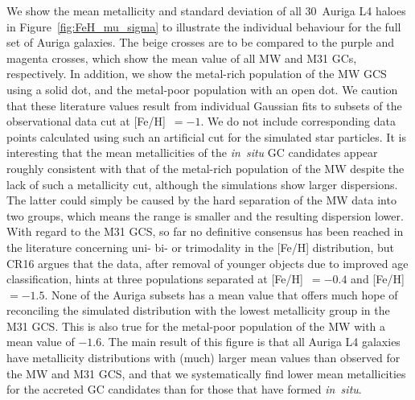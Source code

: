 \documentclass[a4paper,fleqn,usenatbib]{mnras}
\begin{document}
We show the mean metallicity and standard deviation of all $30$~Auriga L4 haloes
in Figure~\ref{fig:FeH_mu_sigma} to illustrate the individual behaviour for the 
full set of Auriga galaxies. The beige crosses are to be compared to the purple 
and magenta crosses, which show the mean value of all MW and M31 GCs, respectively. 
In addition, we show the metal-rich population of the MW GCS using a solid dot, 
and the metal-poor population with an open dot. We caution that
these literature values result from individual Gaussian fits to subsets of the 
observational data cut at [Fe/H]~$= -1$. We do not include corresponding data 
points calculated using such an artificial cut for the simulated star particles.
It is interesting that the mean metallicities of the {\it in~situ} GC candidates 
appear roughly consistent with that of the metal-rich population of the MW despite 
the lack of such a metallicity cut, although the simulations show larger dispersions. 
The latter could simply be caused by the hard separation of the MW data into two 
groups, which means the range is smaller and the resulting dispersion lower. With 
regard to the M31 GCS, so far no definitive consensus has been reached
in the literature concerning uni- bi- or trimodality in the [Fe/H] distribution, 
but CR16 argues that the data, after removal of younger objects due to improved 
age classification, hints at three populations separated at [Fe/H]~$=-0.4$ and 
[Fe/H]~$ = -1.5$. None of the Auriga subsets has a mean value that offers much 
hope of reconciling the simulated distribution with the lowest metallicity 
group in the M31 GCS. This is also true for the metal-poor population of the 
MW with a mean value of $-1.6$. The main result of this figure is 
that all Auriga L4 galaxies have metallicity distributions with (much) larger
mean values than observed for the MW and M31 GCS, and that we 
systematically find lower mean metallicities for the accreted GC candidates
than for those that have formed {\it in~situ}.
\end{document}
